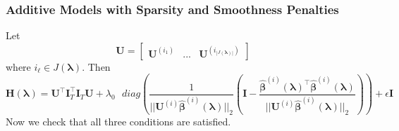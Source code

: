 \documentclass[12pt,letterpaper]{article}
\begin{document}
\subsubsection{Additive Models with Sparsity and Smoothness Penalties}
\label{sec_appendix:sparse_add_models}
Let 
\begin{equation}
\boldsymbol{U} = \begin{bmatrix}
\boldsymbol {U}^{(i_1)} & ... & \boldsymbol {U}^{(i_{|J(\boldsymbol \lambda)|})}
\end{bmatrix}
\end{equation}
where $i_\ell \in J(\boldsymbol \lambda)$. Then
\begin{equation}
\boldsymbol{H}(\boldsymbol\lambda)
= \boldsymbol{U}^\top \boldsymbol I_T^\top \boldsymbol I_T \boldsymbol{U}
+ \lambda_0 \text{ } diag \left (
\frac{1}{||\boldsymbol {U}^{(i)}  \hat{\boldsymbol{\beta}}^{(i)} (\boldsymbol \lambda)||_2} \left (
\boldsymbol I - \frac{\hat{\boldsymbol{\beta}}^{(i)} (\boldsymbol \lambda)^\top \hat{\boldsymbol{\beta}}^{(i)} (\boldsymbol \lambda)}{||\boldsymbol {U}^{(i)}  \hat{\boldsymbol{\beta}}^{(i)} (\boldsymbol \lambda)||_2}
\right ) \right )
+ \epsilon \boldsymbol I
\label{eq:add_hessian}
\end{equation}
Now we check that all three conditions are satisfied.
\end{document}
